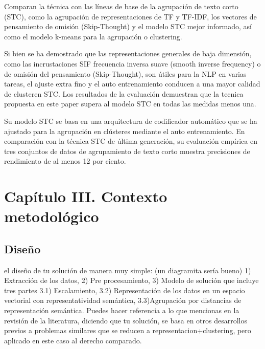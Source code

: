 \documentclass[12pt]{article}
\begin{document}
			
			Comparan la técnica con las líneas de base de la agrupación de texto corto (STC), como la agrupación de representaciones de TF y TF-IDF, los vectores de pensamiento de omisión (Skip-Thought) y el modelo STC mejor informado, así como el modelo k-means para la agrupación o clustering. 
			
			Si bien se ha demostrado que las representaciones generales de baja dimensión, como las incrustaciones SIF frecuencia inversa suave (smooth inverse frequency) o de omisión del pensamiento (Skip-Thought), son útiles para la NLP en varias tareas, el ajuste extra fino y el auto entrenamiento conducen a una mayor calidad de clusteren STC. Los resultados de la evaluación demuestran que la tecnica propuesta en este paper supera al modelo STC en todas las medidas menos una.
			
			Su modelo STC se basa en una arquitectura de codificador automático que se ha ajustado para la agrupación en clústeres mediante el auto entrenamiento. En comparación con la técnica STC de última generación, su evaluación empírica en tres conjuntos de datos de agrupamiento de texto corto muestra precisiones de rendimiento de al menos 12 por ciento.
	
	
	
			
			
			
			
			
			
						
	

		
		
		\newpage
	\section{Capítulo III. Contexto metodológico}
		\subsection{Diseño}	
		el diseño de tu solución  de manera muy simple: (un diagramita sería bueno) 1) Extracción de los datos, 2) Pre procesamiento, 3) Modelo de solución que incluye tres partes 3.1) Escalamiento, 3.2) Representación de los datos en un espacio vectorial con representatividad semántica,  3.3)Agrupación por distancias de representación semántica.
		Puedes hacer referencia a lo que mencionas en la revisión de la literatura, diciendo que tu solución, se basa en otros desarrollos previos a problemas similares que se reducen a representacion+clustering, pero aplicado en este caso al derecho comparado. 
		
\end{document}
